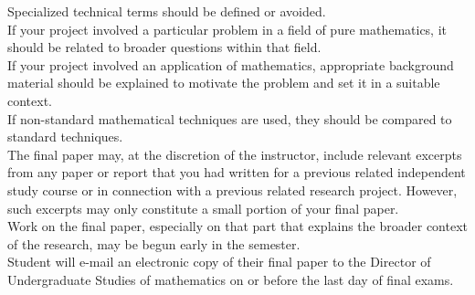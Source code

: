 \documentclass[a4paper]{article}
\begin{document}
Specialized technical terms should be defined or avoided. \\

If your project involved a particular problem in a field of pure mathematics, it should be related to broader questions within that field. \\

If your project involved an application of mathematics, appropriate background material should be explained to motivate the problem and set it in a suitable context. \\

If non-standard mathematical techniques are used, they should be compared to standard techniques. \\

The final paper may, at the discretion of the instructor, include relevant excerpts from any paper or report that you had written for a previous related independent study course or in connection with a previous related research project. However, such excerpts may only constitute a small portion of your final paper. \\

Work on the final paper, especially on that part that explains the broader context of the research, may be begun early in the semester. \\

Student will e-mail an electronic copy of their final paper to the Director of Undergraduate Studies of mathematics on or before the last day of final exams. \\

\newpage

\maketitle
\end{document}
